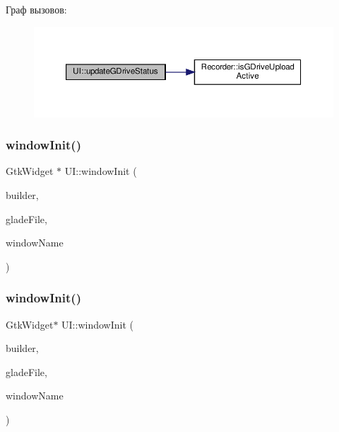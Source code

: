 Граф вызовов\+:\nopagebreak
\begin{figure}[H]
\begin{center}
\leavevmode
\includegraphics[width=350pt]{class_u_i_af5cf1161c6d50b6e1b1fbcfb6123e10f_cgraph}
\end{center}
\end{figure}
\mbox{\label{class_u_i_ad6b4d1f070f96f4a8cd7919595b2f9a7}} 
\subsubsection{\texorpdfstring{window\+Init()}{windowInit()}\hspace{0.1cm}{\footnotesize\ttfamily [1/2]}}
{\footnotesize\ttfamily Gtk\+Widget $\ast$ U\+I\+::window\+Init (\begin{DoxyParamCaption}\item[{Gtk\+Builder $\ast$$\ast$}]{builder,  }\item[{string}]{glade\+File,  }\item[{string}]{window\+Name }\end{DoxyParamCaption})\hspace{0.3cm}{\ttfamily [private]}}

\mbox{\label{class_u_i_ad65c4c017205871946a731f015d74f3c}} 
\subsubsection{\texorpdfstring{window\+Init()}{windowInit()}\hspace{0.1cm}{\footnotesize\ttfamily [2/2]}}
{\footnotesize\ttfamily Gtk\+Widget$\ast$ U\+I\+::window\+Init (\begin{DoxyParamCaption}\item[{Gtk\+Builder $\ast$$\ast$}]{builder,  }\item[{string}]{glade\+File,  }\item[{string}]{window\+Name }\end{DoxyParamCaption})\hspace{0.3cm}{\ttfamily [private]}}



